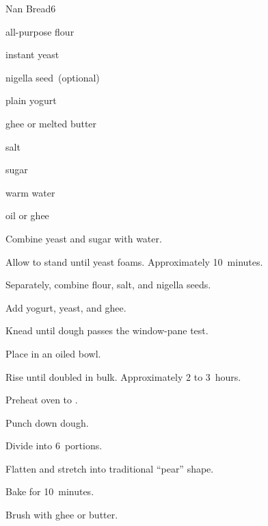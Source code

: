 \begin{recipe}{Nan Bread}{}{6}

\begin{ingredients}
\item {} all-purpose flour
\item {} instant yeast
\item {} nigella seed~(optional)
\item {} plain yogurt
\item {} ghee or melted butter
\item {} salt
\item {} sugar
\item \C{\threequarter} warm water
\item oil or ghee
\end{ingredients}

\begin{directions}
\item Combine yeast and sugar with water.
\item Allow to stand until yeast foams. Approximately 10~minutes.
\item Separately, combine flour, salt, and nigella seeds.
\item Add yogurt, yeast, and ghee.
\item Knead until dough passes the window-pane test.
\item Place in an oiled bowl.
\item Rise until doubled in bulk. Approximately 2 to 3~hours.
\item Preheat oven to .
\item Punch down dough.
\item Divide into 6~portions.
\item Flatten and stretch into traditional ``pear'' shape.
\item Bake for 10~minutes.
\item Brush with ghee or butter.
\end{directions}

\end{recipe}

